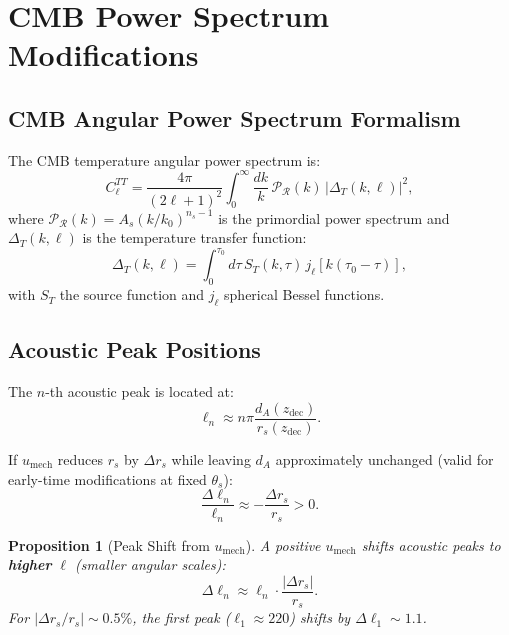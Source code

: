 \documentclass[11pt,a4paper]{article}
\newcommand{\umech}{\ensuremath{u_{\mathrm{mech}}}}
\newcommand{\zdec}{\ensuremath{z_{\mathrm{dec}}}}
\newcommand{\rs}{\ensuremath{r_s}}
\newcommand{\dA}{\ensuremath{d_A}}
\newtheorem{proposition}[theorem]{Proposition}
\theoremstyle{definition}
\theoremstyle{remark}
\begin{document}
\section{CMB Power Spectrum Modifications}
\label{sec:cmb_spectrum}

\subsection{CMB Angular Power Spectrum Formalism}
\label{sec:cmb_formalism}

The CMB temperature angular power spectrum is:
\begin{equation}
C_\ell^{TT} = \frac{4\pi}{(2\ell+1)^2} \int_0^\infty \frac{dk}{k} \, \mathcal{P}_\mathcal{R}(k) \, |\Delta_T(k,\ell)|^2,
\end{equation}
where $\mathcal{P}_\mathcal{R}(k) = A_s (k/k_0)^{n_s-1}$ is the primordial power spectrum and $\Delta_T(k,\ell)$ is the temperature transfer function:
\begin{equation}
\Delta_T(k,\ell) = \int_0^{\tau_0} d\tau \, S_T(k,\tau) \, j_\ell[k(\tau_0 - \tau)],
\end{equation}
with $S_T$ the source function and $j_\ell$ spherical Bessel functions.

\subsection{Acoustic Peak Positions}
\label{sec:peak_positions}

The $n$-th acoustic peak is located at:
\begin{equation}
\label{eq:peak_position}
\ell_n \approx n\pi \frac{\dA(\zdec)}{\rs(\zdec)}.
\end{equation}

If $\umech$ reduces $\rs$ by $\Delta\rs$ while leaving $\dA$ approximately unchanged (valid for early-time modifications at fixed $\theta_s$):
\begin{equation}
\frac{\Delta\ell_n}{\ell_n} \approx -\frac{\Delta\rs}{\rs} > 0.
\end{equation}

\begin{proposition}[Peak Shift from $\umech$]
\label{prop:peak_shift}
A positive $\umech$ shifts acoustic peaks to \textbf{higher} $\ell$ (smaller angular scales):
\begin{equation}
\boxed{\Delta\ell_n \approx \ell_n \cdot \frac{|\Delta\rs|}{\rs}.}
\end{equation}
For $|\Delta\rs/\rs| \sim 0.5\%$, the first peak ($\ell_1 \approx 220$) shifts by $\Delta\ell_1 \sim 1.1$.
\end{proposition}
\end{document}
